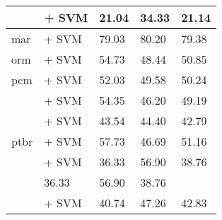 \begin{table*}[ht]
\begin{tabular}{@{}llp{1.1cm}p{1.1cm}p{1.1cm}@{}}
                                           & \citep{adelani2023xlmrobertakinyrwanda} + SVM                      & 21.04                           & 34.33                              & 21.14                             \\
        \midrule
        mar                                & \citep{wang2024multilingual} + SVM                                 & 79.03                           & 80.20                              & 79.38                             \\
        \midrule
        orm                                & \citep{wang2024multilingual} + SVM                                 & 54.73                           & 48.44                              & 50.85                             \\
        \midrule
        pcm                                & \citep{wang2024multilingual} + SVM                                 & 52.03                           & 49.58                              & 50.24                             \\
        \midrule
        \multirow{5}{*}{ptbr}              & \citep{wang2024multilingual} + SVM                                 & 54.35                           & 46.20                              & 49.19                             \\
                                           & \citep{filho2023bertportuguesenliassin2} + SVM                     & 43.54                           & 44.40                              & 42.79                             \\
                                           & \citep{souza2020bertimbau} + SVM                                   & 57.73                           & 46.69                              & 51.16                             \\
                                           & \citep{melo2023bertlargeportuguesests} + SVM                       & 36.33                           & 56.90                              & 38.76                             \\                                             & 36.33                                & 56.90              & 38.76             \\
                                           & \citep{sturua2024jinaembeddingsv3multilingualembeddingstask} + SVM & 40.74                           & 47.26                              & 42.83                             \\
        \midrule

\end{tabular}
\end{table*}
